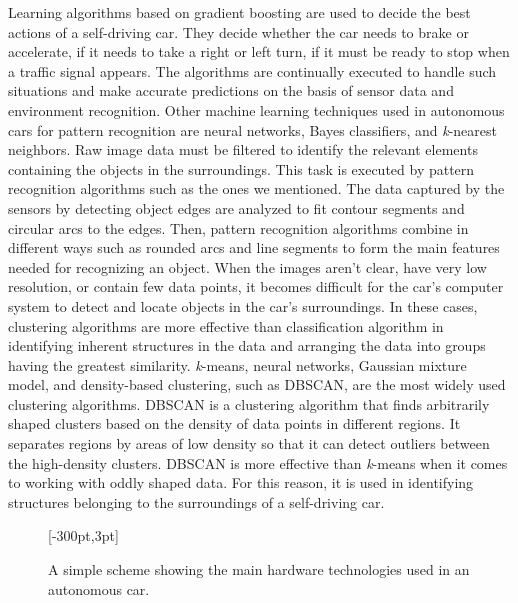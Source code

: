 Learning algorithms based on gradient boosting are used to decide the best actions of a self-driving car. They decide whether the car needs to brake or accelerate, if it needs to take a right or left turn, if it must be ready to stop when a traffic signal appears. The algorithms are continually executed to handle such situations and make accurate predictions on the basis of sensor data and environment recognition. Other machine learning techniques used in autonomous cars for pattern recognition are neural networks, Bayes classifiers, and \textit{k}-nearest neighbors. Raw image data must be filtered to identify the relevant elements containing the objects in the surroundings. This task is executed by pattern recognition algorithms such as the ones we mentioned. The data captured by the sensors by detecting object edges are analyzed to fit contour segments and circular arcs to the edges. Then, pattern recognition algorithms combine in different ways such as rounded arcs and line segments to form the main features needed for recognizing an object. When the images aren't clear, have very low resolution, or contain few data points, it becomes difficult for the car's computer system to detect and locate objects in the car's surroundings. In these cases, clustering algorithms are more effective than classification algorithm in identifying inherent structures in the data and arranging the data into groups having the greatest similarity. \textit{k}-means, neural networks, Gaussian mixture model, and density-based clustering, such as DBSCAN, are the most widely used clustering algorithms. DBSCAN is a clustering algorithm that finds arbitrarily shaped clusters based on the density of data points in different regions. It separates regions by areas of low density so that it can detect outliers between the high-density clusters. DBSCAN is more effective than \textit{k}-means when it comes to working with oddly shaped data. For this reason, it is used in identifying structures belonging to the surroundings of a self-driving car.


\begin{figure}[!t]
[-300pt,3pt]
\caption{\label{fig:5.1}A simple scheme showing the main hardware technologies used in an autonomous car.}
\end{figure}


